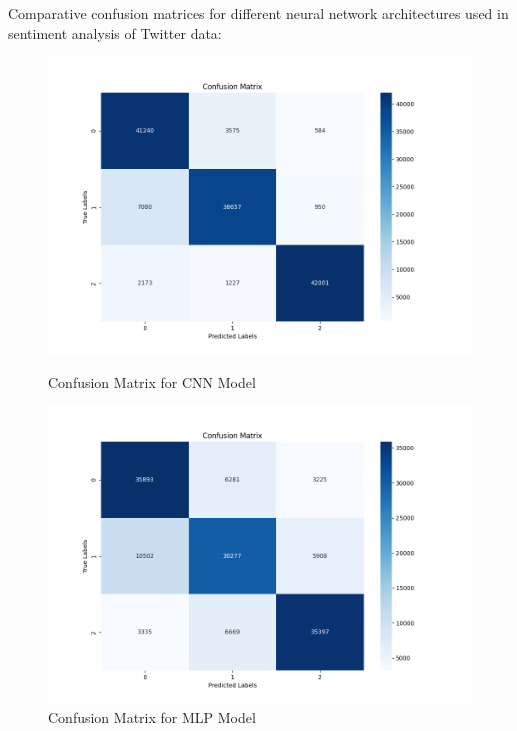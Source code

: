 \documentclass{article}
\begin{document}
Comparative confusion matrices for different neural network architectures used in sentiment
analysis of Twitter data:
\begin{figure}[H]
  \centering
  \begin{minipage}[b]{0.45\textwidth}
    \centering
    \includegraphics[width=0.9\linewidth]{CNN_Modelconfusion_matrix_cnn.png}
    \caption{Confusion Matrix for CNN Model}
    \label{fig:image1}
  \end{minipage}
  \hfill
  \begin{minipage}[b]{0.45\textwidth}
    \centering
    \includegraphics[width=0.9\linewidth]{MLP_Classifierconfusion_matrix_cnn.png}
    \caption{Confusion Matrix for MLP Model}
    \label{fig:image2}
  \end{minipage}
\end{figure}
\end{document}
